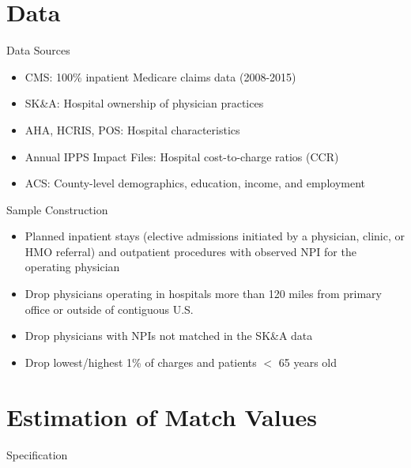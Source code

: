 \documentclass[t]{beamer}
\begin{document}
\section{Data}
\begin{frame}{Data Sources}
    \begin{itemize}
        \item CMS: 100\% inpatient Medicare claims data (2008-2015)
        \item SK\&A: Hospital ownership of physician practices
        \item AHA, HCRIS, POS: Hospital characteristics
        \item Annual IPPS Impact Files: Hospital cost-to-charge ratios (CCR)
        \item ACS: County-level demographics, education, income, and employment
    \end{itemize}
\end{frame}

\begin{frame}{Sample Construction}
    \begin{itemize}
        \item<1-> Planned inpatient stays (elective admissions initiated by a physician, clinic, or HMO referral) and outpatient procedures with observed NPI for the operating physician
        \item<2-> Drop physicians operating in hospitals more than 120 miles from primary office or outside of contiguous U.S.
        \item<3-> Drop physicians with NPIs not matched in the SK\&A data
        \item<4-> Drop lowest/highest 1\% of charges and patients $<$ 65 years old
    \end{itemize}
\end{frame}



\section{Estimation of Match Values}
\begin{frame}{Specification}
\end{frame}
\end{document}
